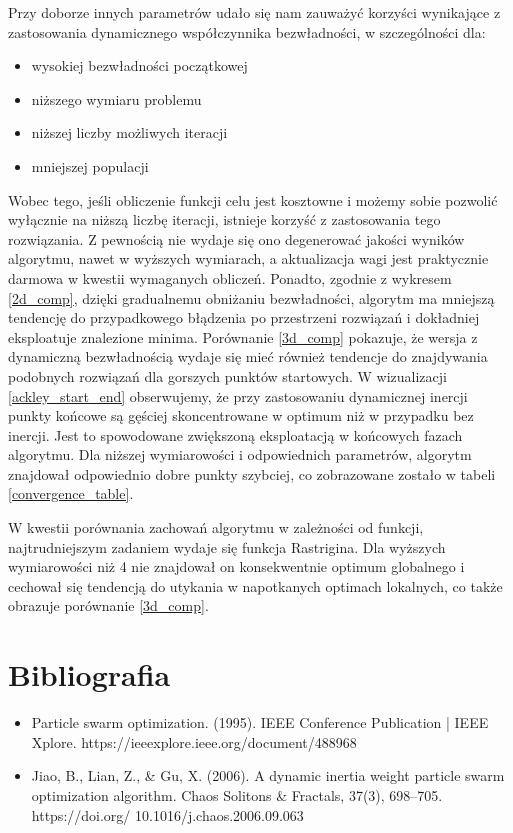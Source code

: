 \documentclass[12pt]{article}
\begin{document}
Przy doborze innych parametrów udało się nam zauważyć korzyści wynikające z zastosowania dynamicznego współczynnika bezwładności, w szczególności dla:
\begin{itemize}
	\item wysokiej bezwładności początkowej
	\item niższego wymiaru problemu
	\item niższej liczby możliwych iteracji
	\item mniejszej populacji
\end{itemize}

Wobec tego, jeśli obliczenie funkcji celu jest kosztowne i możemy sobie pozwolić wyłącznie na niższą liczbę iteracji, istnieje korzyść z zastosowania tego rozwiązania.
Z pewnością nie wydaje się ono degenerować jakości wyników algorytmu, nawet w wyższych wymiarach, a aktualizacja wagi jest praktycznie darmowa w kwestii wymaganych obliczeń.
Ponadto, zgodnie z wykresem \ref{2d_comp}, dzięki gradualnemu obniżaniu bezwładności, algorytm ma mniejszą tendencję do przypadkowego błądzenia po przestrzeni rozwiązań i
dokładniej eksploatuje znalezione minima. Porównanie \ref{3d_comp} pokazuje, że wersja z dynamiczną bezwładnością wydaje się mieć również tendencje do znajdywania podobnych
rozwiązań dla gorszych punktów startowych. W wizualizacji \ref{ackley_start_end} obserwujemy, że przy zastosowaniu dynamicznej inercji punkty końcowe są gęściej skoncentrowane
w optimum niż w przypadku bez inercji. Jest to spowodowane zwiększoną eksploatacją w końcowych fazach algorytmu. Dla niższej wymiarowości i odpowiednich parametrów, algorytm znajdował
odpowiednio dobre punkty szybciej, co zobrazowane zostało w tabeli \ref{convergence_table}.

W kwestii porównania zachowań algorytmu w zależności od funkcji, najtrudniejszym zadaniem wydaje się funkcja Rastrigina. Dla wyższych wymiarowości niż 4 nie znajdował on
konsekwentnie optimum globalnego i cechował się tendencją do utykania w napotkanych optimach lokalnych, co także obrazuje porównanie \ref{3d_comp}.

\section{Bibliografia}
\begin{itemize}
	\item{Particle swarm optimization. (1995). IEEE Conference Publication | IEEE Xplore. https://ieeexplore.ieee.org/document/488968}
	\item{Jiao, B., Lian, Z., \& Gu, X. (2006). A dynamic inertia weight particle swarm optimization algorithm. Chaos Solitons \& Fractals, 37(3), 698–705. https://doi.org/ 10.1016/j.chaos.2006.09.063}
\end{itemize}
\end{document}
